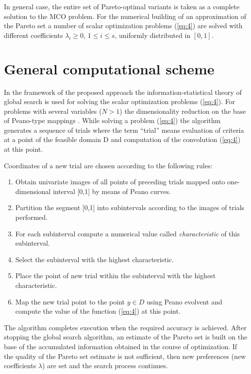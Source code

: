 \documentclass[runningheads]{llncs}
\begin{document}
In general case, the entire set of Pareto-optimal variants is taken as a complete solution to the MCO problem. For the numerical building of an approximation of the Pareto set a number of scalar optimization problems (\ref{eq:4}) are solved with different coefficients $\lambda_i \geq 0$, $1 \leq i \leq s$, uniformly distributed
\textcolor[rgb]{1,0,0}{in $[0,1]$.}

\section{General computational scheme}

In the framework of the proposed approach the information-statistical theory of global search is used for solving the scalar optimization problems (\ref{eq:4}). For problems with several variables ($N>1$) the dimensionality reduction on the base of Peano-type mappings \cite{Sergeyev2013,Strongin2000}. While solving a problem (\ref{eq:4}) the algorithm generates a sequence of trials where the term ``trial'' means evaluation of criteria at a point of the feasible domain D and computation of the convolution (\ref{eq:4}) at this point. 

Coordinates of a new trial are chosen according to the following rules: 

\begin{enumerate}
  \item Obtain univariate images of all points of preceding trials mapped onto one-dimensional interval [0,1] by means of Peano curves.
  \item Partition the segment [0,1] into subintervals according to the images of trials performed.
  \item For each subinterval compute a numerical value called \textit{characteristic} of this subinterval.
  \item Select the subinterval with the highest characteristic.
  \item Place the point of new trial within the subinterval with the highest characteristic. 
  \item Map the new trial point to the point $y \in D$ using Peano evolvent and compute the value of the function (\ref{eq:4}) at this point. 
\end{enumerate}

The algorithm completes execution when the required accuracy is achieved. After stopping the global search algorithm, an estimate of the Pareto set is built on the base of the accumulated information obtained in the course of optimization. If the quality of the Pareto set estimate is not sufficient, then new preferences (new coefficients $\lambda$) are set and the search process continues.
\end{document}
